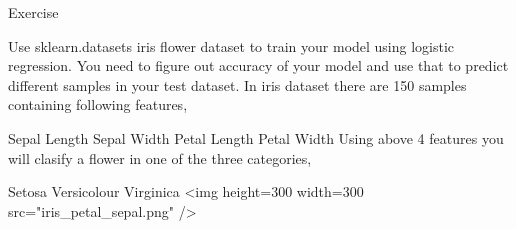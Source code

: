 Exercise

Use sklearn.datasets iris flower dataset to train your model using logistic regression. You need to figure out accuracy of your model and use that to predict different samples in your test dataset. In iris dataset there are 150 samples containing following features,

Sepal Length
Sepal Width
Petal Length
Petal Width
Using above 4 features you will clasify a flower in one of the three categories,

Setosa
Versicolour
Virginica
<img height=300 width=300 src="iris_petal_sepal.png" />
